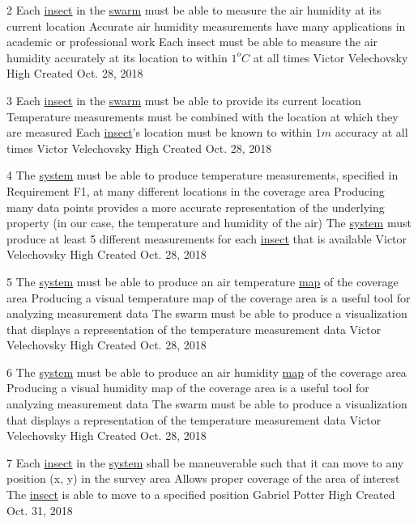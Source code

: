 \documentclass[11pt]{article}
\begin{document}
\functionalRequirement
{2}
{Each \hyperref[sec:definitions]{insect} in the
\hyperref[sec:definitions]{swarm}
must be able to measure
the air humidity at its current location}
{Accurate air humidity measurements have many applications
in academic or professional work}
{Each insect must be able to measure the air humidity accurately at its location
to within \pm $ 1^o C$ at all times}
{Victor Velechovsky}
{High}
{Created Oct. 28, 2018}

\functionalRequirement
{3}
{Each \hyperref[sec:definitions]{insect} in the
\hyperref[sec:definitions]{swarm}
must be able to provide its current location}
{Temperature measurements must be combined with the location
at which they are measured}
{Each \hyperref[sec:definitions]{insect}'s location must be known to within
$1m$ accuracy at all times}
{Victor Velechovsky}
{High}
{Created Oct. 28, 2018}

\functionalRequirement
{4}
{The \hyperref[sec:definitions]{system} must be able to produce temperature
measurements, specified in Requirement F1, at many different locations
in the coverage area}
{Producing many data points provides a more accurate representation of the
underlying property (in our case, the temperature and humidity of the air)}
{The \hyperref[sec:definitions]{system} must produce at least 5 different
measurements for each \hyperref[sec:definitions]{insect} that is
available}
{Victor Velechovsky}
{High}
{Created Oct. 28, 2018}

\functionalRequirement
{5}
{The \hyperref[sec:definitions]{system} must be able to produce an air temperature \hyperref[sec:definitions]{map} of the coverage area}
{Producing a visual temperature map of the coverage area is a useful
tool for analyzing measurement data}
{The swarm must be able to produce a visualization that displays a representation
of the temperature measurement data}
{Victor Velechovsky}
{High}
{Created Oct. 28, 2018}

\functionalRequirement
{6}
{The \hyperref[sec:definitions]{system} must be able to produce an air humidity \hyperref[sec:definitions]{map} of the coverage area}
{Producing a visual humidity map of the coverage area is a useful
tool for analyzing measurement data}
{The swarm must be able to produce a visualization that displays a representation
of the temperature measurement data}
{Victor Velechovsky}
{High}
{Created Oct. 28, 2018}

\functionalRequirement
{7}
{Each \hyperref[sec:definitions]{insect} in the \hyperref[sec:definitions]{system} shall be maneuverable such that it can move to any position (x, y) in the survey area}
{Allows proper coverage of the area of interest}
{The \hyperref[sec:definitions]{insect} is able to move to a specified position}
{Gabriel Potter}
{High}
{Created Oct. 31, 2018}
\end{document}
